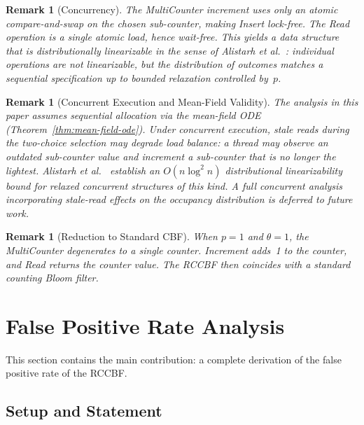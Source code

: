 \documentclass[11pt,a4paper]{article}
\newtheorem{remark}[theorem]{Remark}
\newcommand{\RCCBF}{\textsf{RCCBF}}
\begin{document}
\begin{remark}[Concurrency]\label{rem:concurrency}
The MultiCounter increment uses only an atomic compare-and-swap on the
chosen sub-counter, making Insert lock-free.  The Read operation is a
single atomic load, hence wait-free.  This yields a data structure that is
\emph{distributionally linearizable} in the sense of Alistarh et
al.~\cite{alistarh2018}: individual operations are not linearizable, but
the \emph{distribution} of outcomes matches a sequential specification up
to bounded relaxation controlled by~$p$.
\end{remark}

\begin{remark}[Concurrent Execution and Mean-Field Validity]
\label{rem:concurrent-validity}
The analysis in this paper assumes sequential allocation via the mean-field
ODE (Theorem~\ref{thm:mean-field-ode}).  Under concurrent execution, stale
reads during the two-choice selection may degrade load balance: a thread
may observe an outdated sub-counter value and increment a sub-counter that
is no longer the lightest.  Alistarh et al.~\cite{alistarh2018} establish
an $O(n \log^2 n)$ distributional linearizability bound for relaxed
concurrent structures of this kind.  A full concurrent analysis
incorporating stale-read effects on the occupancy distribution is deferred
to future work.
\end{remark}

\begin{remark}[Reduction to Standard CBF]\label{rem:p1}
When $p = 1$ and $\theta = 1$, the MultiCounter degenerates to a single
counter.  Increment adds~1 to the counter, and Read returns the counter
value.  The \RCCBF{} then coincides with a standard counting Bloom
filter.
\end{remark}

\section{False Positive Rate Analysis}\label{sec:fpr}

This section contains the main contribution: a complete derivation
of the false positive rate of the \RCCBF{}.

\subsection{Setup and Statement}\label{ssec:fpr-setup}
\end{document}
